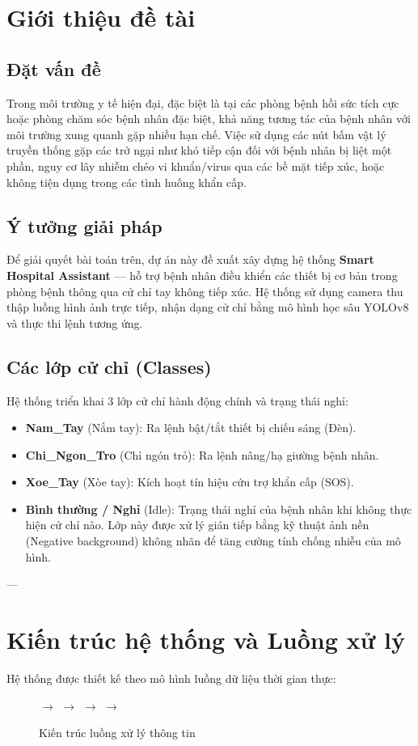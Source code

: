 \documentclass[12pt,a4paper]{article}
\begin{document}
\section{Giới thiệu đề tài}
\subsection{Đặt vấn đề}
Trong môi trường y tế hiện đại, đặc biệt là tại các phòng bệnh hồi sức tích cực hoặc phòng chăm sóc bệnh nhân đặc biệt, khả năng tương tác của bệnh nhân với môi trường xung quanh gặp nhiều hạn chế. Việc sử dụng các nút bấm vật lý truyền thống gặp các trở ngại như khó tiếp cận đối với bệnh nhân bị liệt một phần, nguy cơ lây nhiễm chéo vi khuẩn/virus qua các bề mặt tiếp xúc, hoặc không tiện dụng trong các tình huống khẩn cấp.

\subsection{Ý tưởng giải pháp}
Để giải quyết bài toán trên, dự án này đề xuất xây dựng hệ thống \textbf{Smart Hospital Assistant} — hỗ trợ bệnh nhân điều khiển các thiết bị cơ bản trong phòng bệnh thông qua cử chỉ tay không tiếp xúc. Hệ thống sử dụng camera thu thập luồng hình ảnh trực tiếp, nhận dạng cử chỉ bằng mô hình học sâu YOLOv8 và thực thi lệnh tương ứng.

\subsection{Các lớp cử chỉ (Classes)}
Hệ thống triển khai 3 lớp cử chỉ hành động chính và trạng thái nghỉ:
\begin{itemize}
    \item \textbf{Nam\_Tay} (Nắm tay): Ra lệnh bật/tắt thiết bị chiếu sáng (Đèn).
    \item \textbf{Chi\_Ngon\_Tro} (Chỉ ngón trỏ): Ra lệnh nâng/hạ giường bệnh nhân.
    \item \textbf{Xoe\_Tay} (Xòe tay): Kích hoạt tín hiệu cứu trợ khẩn cấp (SOS).
    \item \textbf{Bình thường / Nghỉ} (Idle): Trạng thái nghỉ của bệnh nhân khi không thực hiện cử chỉ nào. Lớp này được xử lý gián tiếp bằng kỹ thuật ảnh nền (Negative background) không nhãn để tăng cường tính chống nhiễu của mô hình.
\end{itemize}

---

\section{Kiến trúc hệ thống và Luồng xử lý}
Hệ thống được thiết kế theo mô hình luồng dữ liệu thời gian thực:
\begin{figure}[H]
    \centering
     $\rightarrow$  $\rightarrow$  $\rightarrow$  $\rightarrow$ 
    \caption{Kiến trúc luồng xử lý thông tin}
\end{figure}
\end{document}
